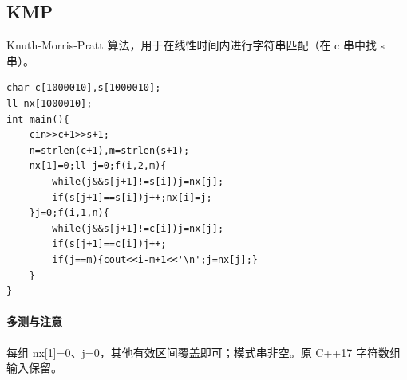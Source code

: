 \subsection{KMP}
Knuth-Morris-Pratt 算法，用于在线性时间内进行字符串匹配（在 c 串中找 s 串）。
\begin{lstlisting}
char c[1000010],s[1000010];
ll nx[1000010];
int main(){
	cin>>c+1>>s+1;
	n=strlen(c+1),m=strlen(s+1);
	nx[1]=0;ll j=0;f(i,2,m){
		while(j&&s[j+1]!=s[i])j=nx[j];
		if(s[j+1]==s[i])j++;nx[i]=j;
	}j=0;f(i,1,n){
		while(j&&s[j+1]!=c[i])j=nx[j];
		if(s[j+1]==c[i])j++;
		if(j==m){cout<<i-m+1<<'\n';j=nx[j];}
	}
}
\end{lstlisting}

\paragraph{多测与注意} 每组 nx[1]=0、j=0，其他有效区间覆盖即可；模式串非空。原 C++17 字符数组输入保留。
